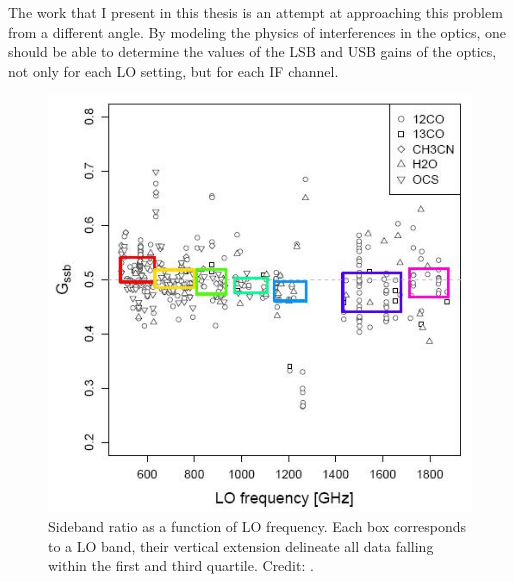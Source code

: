 The work that I present in this thesis is an attempt at approaching this problem from a different angle.
By modeling the physics of interferences in the optics, one should be able to determine the values of the LSB and USB gains of the optics, not only for each LO setting, but for each IF channel.

\begin{figure}[hbp]
    \centering
    \includegraphics[width=.75\textwidth]{sideband_ratio}
    \caption{
        Sideband ratio as a function of LO frequency.
        Each box corresponds to a LO band, their vertical extension delineate all data falling within the first and third quartile.
        Credit: \textcite{higgins2014effect}.
    }
    \label{fig:sideband_ratio}
\end{figure}

